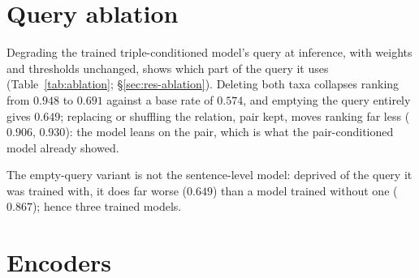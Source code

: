 \documentclass[11pt]{article}
\begin{document}
\section{Query ablation}
\label{app:ablation}

\begin{table}[t]\centering\small
\setlength{\tabcolsep}{4pt}
\caption{Degrading segment~A of the trained triple-conditioned model at inference, weights and its
own block-held-out thresholds unchanged; AUPRC of the three-checkpoint ensemble. Base rate $0.574$.
Per-seed standard deviations on AUPRC are $\le 0.032$.}
\label{tab:ablation}
\end{table}

Degrading the trained triple-conditioned model's query at inference, with weights and thresholds
unchanged, shows which part of the query it uses (Table~\ref{tab:ablation}; \S\ref{sec:res-ablation}). Deleting both taxa
collapses ranking from $0.948$ to $0.691$ against a base rate of $0.574$, and emptying the query
entirely gives $0.649$; replacing or shuffling the relation, pair kept, moves ranking far less
($0.906$, $0.930$): the model leans on the pair, which is what the pair-conditioned model already
showed.

The empty-query variant is not the sentence-level model: deprived of the query it was trained
with, it does far worse ($0.649$) than a model trained without one ($0.867$); hence three trained
models.

\section{Encoders}
\label{app:encoders}
\end{document}
